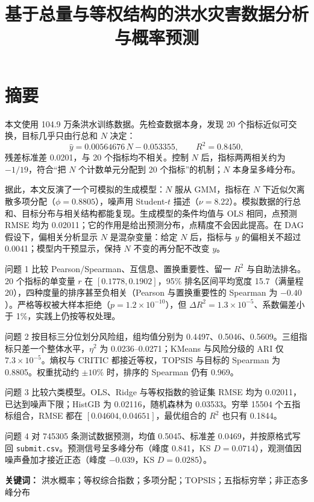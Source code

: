 \documentclass{article}
\title{基于总量与等权结构的洪水灾害数据分析与概率预测}
\author{}
\date{}
\begin{document}
\maketitle



\section*{摘要}

本文使用 104.9 万条洪水训练数据。先检查数据本身，发现 20 个指标近似可交换，目标几乎只由行总和 \(N\) 决定：
\[
\hat y=0.00564676\,N-0.053355,\qquad R^2=0.8450,
\]
残差标准差 0.0201，与 20 个指标均不相关。控制 \(N\) 后，指标两两相关约为 \(-1/19\)，符合“把 \(N\) 个计数单元分配到 20 个指标”的机制；\(N\) 本身呈多峰分布。

据此，本文反演了一个可模拟的生成模型：\(N\) 服从 GMM，指标在 \(N\) 下近似欠离散多项分配（\(\phi=0.8805\)），噪声用 Student-\(t\) 描述（\(\nu=8.22\)）。模拟数据的行总和、目标分布与相关结构都能复现。生成模型的条件均值与 OLS 相同，点预测 RMSE 均为 0.02011；它的作用是给出预测分布，点精度不会因此提高。在 DAG 假设下，偏相关分析显示 \(N\) 是混杂变量：给定 \(N\) 后，指标与 \(y\) 的偏相关不超过 0.0041；模型内干预显示，保持 \(N\) 不变的再分配不改变 \(y\)。

问题 1 比较 Pearson/Spearman、互信息、置换重要性、留一 \(R^2\) 与自助法排名。20 个指标的单变量 \(r\) 在 \([0.1778,0.1902]\)，95\% 排名区间平均宽度 15.7（满量程 20），四种度量的排序甚至负相关（Pearson 与置换重要性的 Spearman 为 \(-0.40\)）。严格等权被大样本拒绝（\(p=1.2\times10^{-10}\)），但 \(\Delta R^2=1.3\times10^{-5}\)、系数偏差小于 1\%，实践上仍按等权处理。

问题 2 按目标三分位划分风险组，组均值分别为 0.4497、0.5046、0.5609。三组指标只差一个整体水平，\(\eta^2\) 为 0.0236–0.0271；KMeans 与风险分级的 ARI 仅 \(7.3\times10^{-5}\)。熵权与 CRITIC 都接近等权，TOPSIS 与目标的 Spearman 为 0.8805。权重扰动约 \(\pm10\%\) 时，排序的 Spearman 仍有 0.969。

问题 3 比较六类模型。OLS、Ridge 与等权指数的验证集 RMSE 均为 0.02011，已达到噪声下限；HistGB 为 0.02116，随机森林为 0.03533。穷举 15504 个五指标组合，RMSE 都在 \([0.04604,0.04651]\)，最优组合的 \(R^2\) 也只有 0.1844。

问题 4 对 745305 条测试数据预测，均值 0.5045、标准差 0.0469，并按原格式写回 \texttt{submit.csv}。预测信号呈多峰分布（峰度 0.841，KS \(D=0.0714\)），观测值因噪声叠加才接近正态（峰度 \(-0.039\)，KS \(D=0.0285\)）。


\noindent\textbf{关键词：} 洪水概率；等权综合指数；多项分配；TOPSIS；五指标穷举；非正态多峰分布
\end{document}
